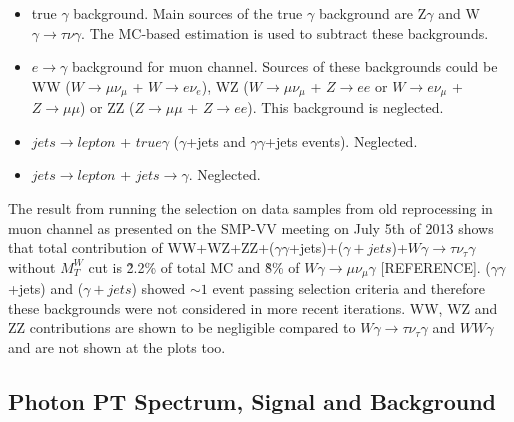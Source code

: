 \begin{itemize}
   \item true $\gamma$ background. Main sources of the true $\gamma$ background are Z$\gamma$ and W$\gamma \rightarrow \tau \nu \gamma$. The MC-based estimation is used to subtract these backgrounds.
   \item $e \rightarrow \gamma$ background for muon channel. Sources of these backgrounds could be WW ($W \rightarrow \mu\nu_{\mu}$ + $W \rightarrow e\nu_e$), WZ ($W \rightarrow \mu\nu_{\mu}$ + $Z \rightarrow ee$ or $W \rightarrow e\nu_{\mu}$ + $Z \rightarrow \mu\mu$) or ZZ ($Z \rightarrow \mu\mu$ + $Z \rightarrow ee$). This background is neglected.
   \item $jets \rightarrow lepton$ + $true \gamma$ ($\gamma$+jets and $\gamma\gamma$+jets events). Neglected.
   \item $jets \rightarrow lepton$ + $jets \rightarrow \gamma$. Neglected. 
\end{itemize}

The result from running the selection on data samples from old reprocessing in muon channel as presented on the SMP-VV meeting on July 5th of 2013 shows that total contribution of WW+WZ+ZZ+($\gamma\gamma$+jets)+($\gamma+jets$)+$W\gamma \rightarrow \tau\nu_{\tau}\gamma$ without $M_T^W$ cut is \~2.2\% of total MC and \~8\% of $W\gamma \rightarrow \mu\nu_{\mu}\gamma$ [REFERENCE]. ($\gamma\gamma$+jets) and ($\gamma+jets$) showed $\sim 1$ event passing selection criteria and therefore these backgrounds were not considered in more recent iterations. WW, WZ and ZZ contributions are shown to be negligible compared to $W\gamma \rightarrow \tau\nu_{\tau}\gamma$ and $WW\gamma$ and are not shown at the plots too.



\subsection{Photon PT Spectrum, Signal and Background}

